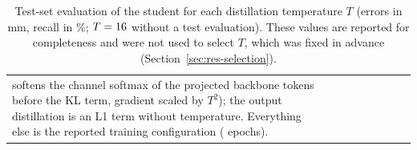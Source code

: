 \begin{table}[!tbp]
\begin{tabular}{@{}lrrrrrrrr@{}}
{softens the channel softmax of the projected backbone tokens before the KL term, gradient scaled by $T^2$); the output
distillation is an L1 term without temperature. Everything else is the reported training configuration (\StudentEpochs{} epochs).}
\end{tabular}
\caption[Distillation temperature sweep: final test evaluation]{Test-set evaluation of the student for each
distillation temperature $T$ (errors in mm, recall in \%; $T = 16$ without a test evaluation).
These values are reported for completeness and were not used to select $T$, which was fixed in advance
(Section~\ref{sec:res-selection}).}
\label{tab:kd-temperature}
\end{table}
